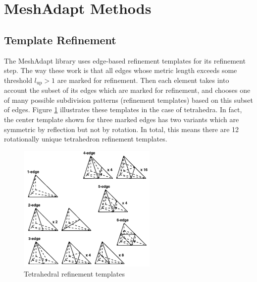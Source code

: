\section{MeshAdapt Methods}
\label{sec:ma_methods}

\subsection{Template Refinement}
\label{sec:ma_refine}

The MeshAdapt library uses edge-based refinement templates for its refinement step.
The way these work is that all edges whose metric length exceeds some threshold
$l_{\text{up}} > 1$ are marked for refinement.
Then each element takes into account the subset of its edges which are marked
for refinement, and chooses one of many possible subdivision patterns
(refinement templates) based on this subset of edges.
Figure \ref{fig:tet_templates} illustrates these templates in the case of tetrahedra.
In fact, the center template shown for three marked edges has two variants which
are symmetric by reflection but not by rotation.
In total, this means there are 12 rotationally unique tetrahedron refinement templates.

\begin{figure}
\begin{center}
\includegraphics[width=0.6\textwidth]{tet_templates.png}
\caption{Tetrahedral refinement templates}
\label{fig:tet_templates}
\end{center}
\end{figure}

